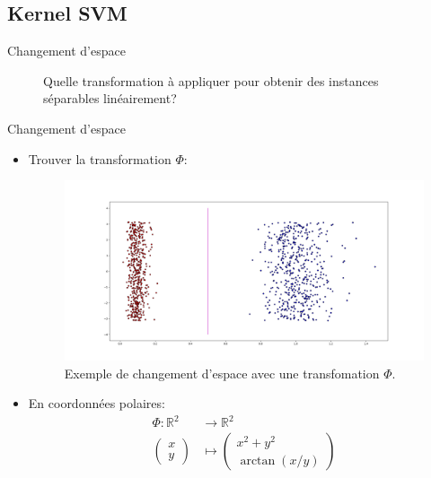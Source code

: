 \documentclass[8pt]{beamer}
\begin{document}
	\subsection[kernel]{Kernel SVM}

	\begin{frame}{Changement d'espace}
		\begin{figure}[H]
			\begin{center}
				
				\caption*{\label{fig::circles_3} Quelle transformation à appliquer pour obtenir des instances séparables linéairement?}
			\end{center}
		\end{figure}
	\end{frame}
	\begin{frame}[plain]{Changement d'espace}
		\begin{itemize}
			\item  Trouver la transformation $\Phi$:
			\begin{figure}[H]
				\includegraphics[width=.7\textwidth]{images/samples/separation_pol}
				\caption*{\label{fig::kernel_polar} Exemple de changement d'espace avec une transfomation $\Phi$.}
			\end{figure}
			\item En coordonnées polaires:
			\begin{align*}
				\Phi: \mathbb{R}^2 &\rightarrow \mathbb{R}^2 \\
				\begin{pmatrix}
					x \\
					y
				\end{pmatrix} &\mapsto \begin{pmatrix}
					x^2 + y^2 \\
					\arctan(x/y)
				\end{pmatrix}
			\end{align*}
		\end{itemize}
	\end{frame}
\end{document}
